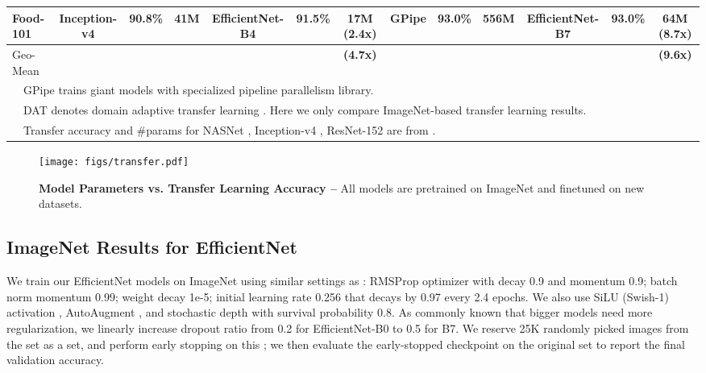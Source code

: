 \documentclass{article}
\begin{document}
\begin{table*}
{\begin{tabular}{l||cccccc||cccccc}
Food-101  &  Inception-v4 & 90.8\% & 41M & EfficientNet-B4 & 91.5\% &  17M (2.4x) & GPipe  & 93.0\% & 556M & EfficientNet-B7 &  \bf  93.0\% &  64M (8.7x) \\
\midrule
        Geo-Mean & & & & & &  \bf (4.7x) &  & & & & &  \bf (9.6x)\\
        \bottomrule[0.15em]
        \multicolumn{13}{l}{~~GPipe \cite{gpipe18} trains giant models with specialized pipeline parallelism library.} \\
        \multicolumn{13}{l}{~~DAT denotes domain adaptive transfer learning \cite{domainjft18}. Here we only compare ImageNet-based transfer learning results.~~} \\
        \multicolumn{13}{l}{~~Transfer accuracy and \#params for NASNet \cite{nas_imagenet18}, Inception-v4 \cite{inceptionv417}, ResNet-152 \cite{resnet16} are from \cite{imagenettransfer18}.~~} \\
        \end{tabular}                                                            
    }                                                                   
    \label{tab:transfer}                                                         
\end{table*} \begin{figure*}
        \centering
        \texttt{[image: figs/transfer.pdf]}
         \vskip -0.2in
        \caption{\textbf{Model Parameters vs. Transfer Learning Accuracy -- } All models are pretrained on ImageNet and finetuned on new datasets. }
        \label{fig:transfer-all}
         \vskip -0.1in
\end{figure*} 
\subsection{ImageNet Results for EfficientNet}

We train our EfficientNet models on ImageNet using similar settings as \cite{mnas18}: RMSProp optimizer with decay 0.9 and momentum 0.9; batch norm  momentum 0.99; weight decay 1e-5;  initial learning rate 0.256 that decays by 0.97 every 2.4 epochs. We also use SiLU (Swish-1) activation \cite{swish18,swishsil18,gelu16},  AutoAugment \cite{autoaugment18}, and stochastic depth \cite{droppath16} with survival probability 0.8. As commonly known that bigger models need more regularization, we linearly increase dropout \cite{dropout14} ratio from 0.2 for EfficientNet-B0 to 0.5 for B7. We reserve 25K randomly picked images from the  set as a  set, and perform early stopping on this ; we then evaluate the early-stopped checkpoint on the original  set to report the final validation accuracy.
\end{document}
